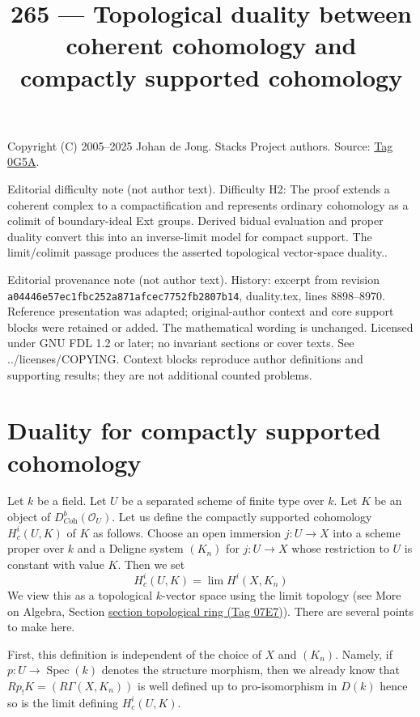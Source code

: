 \documentclass{amsart}
\theoremstyle{plain}
\theoremstyle{definition}
\theoremstyle{remark}
\numberwithin{equation}{subsection}
\def\lim{\mathop{\mathrm{lim}}\nolimits}
\def\Spec{\mathop{\mathrm{Spec}}}
\begin{document}
\title[Stacks Project, Tag 0G5A]{265 --- Topological duality between coherent cohomology and compactly supported cohomology}
\maketitle
\noindent Copyright (C) 2005--2025 Johan de Jong. Stacks Project authors. Source: \href{https://stacks.math.columbia.edu/tag/0G5A}{Tag 0G5A}.

\noindent Editorial difficulty note (not author text). Difficulty H2: The proof extends a coherent complex to a compactification and represents ordinary cohomology as a colimit of boundary-ideal Ext groups. Derived bidual evaluation and proper duality convert this into an inverse-limit model for compact support. The limit/colimit passage produces the asserted topological vector-space duality..

\noindent Editorial provenance note (not author text). History: excerpt from revision \texttt{a0444\allowbreak 6e57e\allowbreak c1fbc\allowbreak 252a8\allowbreak 71afc\allowbreak ec775\allowbreak 2fb28\allowbreak 07b14}, duality.tex, lines 8898--8970. Reference presentation was adapted; original-author context and core support blocks were retained or added. The mathematical wording is unchanged. Licensed under GNU FDL 1.2 or later; no invariant sections or cover texts. See ../licenses/COPYING. Context blocks reproduce author definitions and supporting results; they are not additional counted problems.

\section{Duality for compactly supported cohomology}
\label{section-duality-compactly-supported}

\noindent
Let $k$ be a field. Let $U$ be a separated scheme of finite type over $k$.
Let $K$ be an object of $D^b_{\textit{Coh}}(\mathcal{O}_U)$. Let us define
the compactly supported cohomology $H^i_c(U, K)$ of $K$ as follows.
Choose an open immersion $j : U \to X$ into a scheme proper over $k$
and a Deligne system $(K_n)$ for $j : U \to X$ whose restriction
to $U$ is constant with value $K$. Then we set
$$
H^i_c(U, K) = \lim H^i(X, K_n)
$$
We view this as a topological $k$-vector space using the limit topology
(see More on Algebra, Section \href{https://stacks.math.columbia.edu/tag/07E7}{section topological ring (Tag 07E7)}).
There are several points to make here.

\medskip\noindent
First, this definition is independent of the choice of $X$ and $(K_n)$.
Namely, if $p : U \to \Spec(k)$ denotes the structure morphism, then
we already know that $Rp_!K = (R\Gamma(X, K_n))$
is well defined up to pro-isomorphism in $D(k)$ hence so is the limit
defining $H^i_c(U, K)$.
\end{document}
